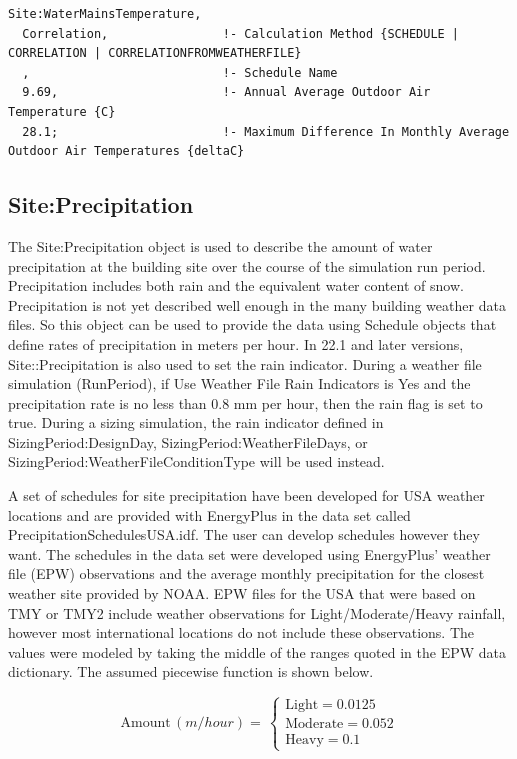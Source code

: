 \begin{lstlisting}
Site:WaterMainsTemperature,
  Correlation,                !- Calculation Method {SCHEDULE | CORRELATION | CORRELATIONFROMWEATHERFILE}
  ,                           !- Schedule Name
  9.69,                       !- Annual Average Outdoor Air Temperature {C}
  28.1;                       !- Maximum Difference In Monthly Average Outdoor Air Temperatures {deltaC}
\end{lstlisting}

\subsection{Site:Precipitation}\label{siteprecipitation}

The Site:Precipitation object is used to describe the amount of water
precipitation at the building site over the course of the simulation run period.
Precipitation includes both rain and the equivalent water content of snow.
Precipitation is not yet described well enough in the many building weather data
files. So this object can be used to provide the data using Schedule objects
that define rates of precipitation in meters per hour. In 22.1 and later
versions, Site::Precipitation is also used to set the rain indicator. During a
weather file simulation (RunPeriod), if Use Weather File Rain Indicators is Yes
and the precipitation rate is no less than 0.8 mm per hour, then the rain flag
is set to true. During a sizing simulation, the rain indicator defined in
SizingPeriod:DesignDay, SizingPeriod:WeatherFileDays, or
SizingPeriod:WeatherFileConditionType will be used instead.

A set of schedules for site precipitation have been developed for USA weather locations and are provided with EnergyPlus in the data set called PrecipitationSchedulesUSA.idf. The user can develop schedules however they want. The schedules in the data set were developed using EnergyPlus' weather file (EPW) observations and the average monthly precipitation for the closest weather site provided by NOAA. EPW files for the USA that were based on TMY or TMY2 include weather observations for Light/Moderate/Heavy rainfall, however most international locations do not include these observations. The values were modeled by taking the middle of the ranges quoted in the EPW data dictionary. The assumed piecewise function is shown below.

\begin{equation}
\mathrm{Amount} \, (m/hour) = \, \left\{
  \begin{array}{ccc}
    \mathrm{Light} = 0.0125 \\
    \mathrm{Moderate} = 0.052 \\
    \mathrm{Heavy} = 0.1
  \end{array}
\right.
\end{equation}

